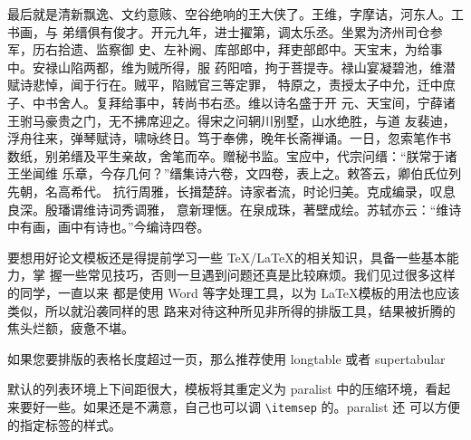 最后就是清新飘逸、文约意赅、空谷绝响的王大侠了。王维，字摩诘，河东人。工书画，与
弟缙俱有俊才。开元九年，进士擢第，调太乐丞。坐累为济州司仓参军，历右拾遗、监察御
史、左补阙、库部郎中，拜吏部郎中。天宝末，为给事中。安禄山陷两都，维为贼所得，服
药阳喑，拘于菩提寺。禄山宴凝碧池，维潜赋诗悲悼，闻于行在。贼平，陷贼官三等定罪，
特原之，责授太子中允，迁中庶子、中书舍人。复拜给事中，转尚书右丞。维以诗名盛于开
元、天宝间，宁薛诸王驸马豪贵之门，无不拂席迎之。得宋之问辋川别墅，山水绝胜，与道
友裴迪，浮舟往来，弹琴赋诗，啸咏终日。笃于奉佛，晚年长斋禅诵。一日，忽索笔作书
数纸，别弟缙及平生亲故，舍笔而卒。赠秘书监。宝应中，代宗问缙：“朕常于诸王坐闻维
乐章，今存几何？”缙集诗六卷，文四卷，表上之。敕答云，卿伯氏位列先朝，名高希代。
抗行周雅，长揖楚辞。诗家者流，时论归美。克成编录，叹息良深。殷璠谓维诗词秀调雅，
意新理惬。在泉成珠，著壁成绘。苏轼亦云：“维诗中有画，画中有诗也。”今编诗四卷。

要想用好论文模板还是得提前学习一些 \TeX/\LaTeX{}的相关知识，具备一些基本能力，掌
握一些常见技巧，否则一旦遇到问题还真是比较麻烦。我们见过很多这样的同学，一直以来
都是使用 Word 等字处理工具，以为 \LaTeX{}模板的用法也应该类似，所以就沿袭同样的思
路来对待这种所见非所得的排版工具，结果被折腾的焦头烂额，疲惫不堪。

如果您要排版的表格长度超过一页，那么推荐使用 \textsf{longtable} 或者 \textsf{supertabular} 

默认的列表环境上下间距很大，模板将其重定义为 \textsf{paralist} 中的压缩环境，看起
来要好一些。如果还是不满意，自己也可以调 \verb|\itemsep| 的。\textsf{paralist} 还
可以方便的指定标签的样式。

